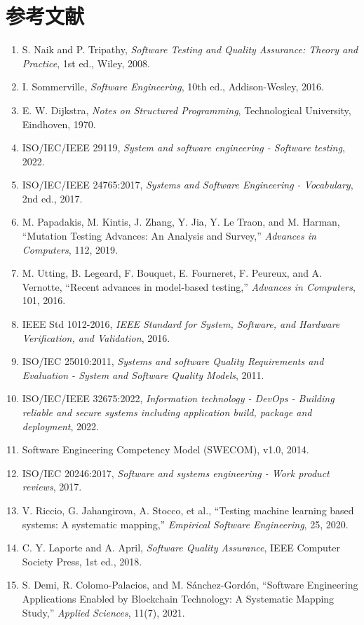 \documentclass[uplatex,dvipdfmx,a4paper,11pt,nomag]{jsarticle}
\begin{document}
\section{参考文献}
\begin{enumerate}[leftmargin=2.2em]
\item S. Naik and P. Tripathy, \textit{Software Testing and Quality Assurance: Theory and Practice}, 1st ed., Wiley, 2008.
\item I. Sommerville, \textit{Software Engineering}, 10th ed., Addison-Wesley, 2016.
\item E. W. Dijkstra, \textit{Notes on Structured Programming}, Technological University, Eindhoven, 1970.
\item ISO/IEC/IEEE 29119, \textit{System and software engineering - Software testing}, 2022.
\item ISO/IEC/IEEE 24765:2017, \textit{Systems and Software Engineering - Vocabulary}, 2nd ed., 2017.
\item M. Papadakis, M. Kintis, J. Zhang, Y. Jia, Y. Le Traon, and M. Harman, ``Mutation Testing Advances: An Analysis and Survey,'' \textit{Advances in Computers}, 112, 2019.
\item M. Utting, B. Legeard, F. Bouquet, E. Fourneret, F. Peureux, and A. Vernotte, ``Recent advances in model-based testing,'' \textit{Advances in Computers}, 101, 2016.
\item IEEE Std 1012-2016, \textit{IEEE Standard for System, Software, and Hardware Verification, and Validation}, 2016.
\item ISO/IEC 25010:2011, \textit{Systems and software Quality Requirements and Evaluation - System and Software Quality Models}, 2011.
\item ISO/IEC/IEEE 32675:2022, \textit{Information technology - DevOps - Building reliable and secure systems including application build, package and deployment}, 2022.
\item Software Engineering Competency Model (SWECOM), v1.0, 2014.
\item ISO/IEC 20246:2017, \textit{Software and systems engineering - Work product reviews}, 2017.
\item V. Riccio, G. Jahangirova, A. Stocco, et al., ``Testing machine learning based systems: A systematic mapping,'' \textit{Empirical Software Engineering}, 25, 2020.
\item C. Y. Laporte and A. April, \textit{Software Quality Assurance}, IEEE Computer Society Press, 1st ed., 2018.
\item S. Demi, R. Colomo-Palacios, and M. Sánchez-Gordón, ``Software Engineering Applications Enabled by Blockchain Technology: A Systematic Mapping Study,'' \textit{Applied Sciences}, 11(7), 2021.

\end{enumerate}
\end{document}
